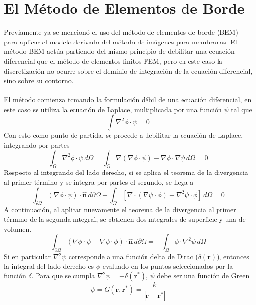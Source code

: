 \documentclass[12pt, oneside, numbers, spanish]{ezthesis}
\numberwithin{equation}{section}
\begin{document}
\section{El Método de Elementos de Borde}\label{Sec:BEM_theory}
Previamente ya se mencionó el uso del método de elementos de borde (BEM) para aplicar el modelo derivado del método de imágenes para membranas. El método BEM actúa partiendo del mismo principio de debilitar una ecuación diferencial que el método de elementos finitos FEM, pero en este caso la discretización no ocurre sobre el dominio de integración de la ecuación diferencial, sino sobre su contorno.\\\\
El método comienza tomando la formulación débil de una ecuación diferencial, en este caso se utiliza la ecuación de Laplace, multiplicada por una función $\psi$ tal que
\begin{equation*}
\int\nabla^2 \phi\cdot\psi = 0
\end{equation*}
Con esto como punto de partida, se procede a debilitar la ecuación de Laplace, integrando por partes
\begin{equation*}
\int_\Omega \nabla^2\phi\cdot\psi\, d\Omega = \int_\Omega \nabla(\nabla \phi\cdot\psi) - \nabla\phi\cdot\nabla\psi\, d\Omega = 0
\end{equation*}
Respecto al integrando del lado derecho, si se aplica el teorema de la divergencia al primer término y se integra por partes el segundo, se llega a
\begin{equation*}
\int_{\partial\Omega} (\nabla\phi\cdot\psi)\cdot\hat{\mathbf{n}}\, d\partial\Omega - \int_\Omega [\nabla\cdot(\nabla\psi\cdot\phi) - \nabla^2\psi\cdot\phi]\, d\Omega = 0
\end{equation*}
A continuación, al aplicar nuevamente el teorema de la divergencia al primer término de la segunda integral, se obtienen dos integrales de superficie y una de volumen.
\begin{equation}\label{eqn:BIE_BEM}
\int_{\partial\Omega} (\nabla\phi\cdot\psi - \nabla\psi\cdot\phi) \cdot\hat{\mathbf{n}}\, d\partial\Omega = -\int_\Omega \phi\cdot\nabla^2\psi\, d\Omega
\end{equation}
Si en particular $\nabla^2\psi$ corresponde a una función delta de Dirac ($\delta(\mathbf{r})$), entonces la integral del lado derecho es $\phi$ evaluado en los puntos seleccionados por la función $\delta$. Para que se cumpla $\nabla^2\psi = -\delta(\mathbf{r}^*)$, $\psi$ debe ser una función de Green
\begin{equation}\label{eqn:Dirac_delta}
\psi = G(\mathbf{r},\mathbf{r}^*) = \frac{k}{|\mathbf{r} - \mathbf{r}^*|}
\end{equation}
\end{document}
